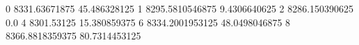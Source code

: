 0 8331.63671875 45.486328125
1 8295.5810546875 9.4306640625
2 8286.150390625 0.0
4 8301.53125 15.380859375
6 8334.2001953125 48.0498046875
8 8366.8818359375 80.7314453125
